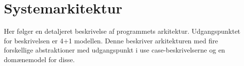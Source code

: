 \chapter{Systemarkitektur}
Her følger en detaljeret beskrivelse af programmets arkitektur. Udgangspunktet for beskrivelsen er 4+1 modellen. Denne beskriver arkitekturen med fire forskellige abstraktioner med udgangspunkt i use case-beskrivelserne og en domænemodel for disse.






